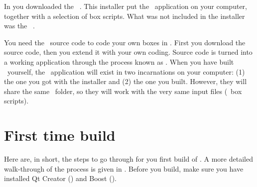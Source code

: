 In  you downloaded the \US\ . This installer put the \US\ application on your computer, together with a selection of box scripts. What was not included in the installer was the \US\ .

You need the \US\ source code to code your own boxes in \CPP. First you download the source code, then you extend it with your own coding. Source code is turned into a working application through the process known as . When you have built \US\ yourself, the \US\ application will exist in two incarnations on your computer: (1) the one you got with the installer and (2) the one you built. However, they will share the same \ folder, so they will work with the very same input files (\eg\ box scripts).

\section{First time build}
Here are, in short, the steps to go through for you first build of \US. A more detailed walk-through of the process is given in . Before you build, make sure you have installed Qt Creator () and Boost ().

